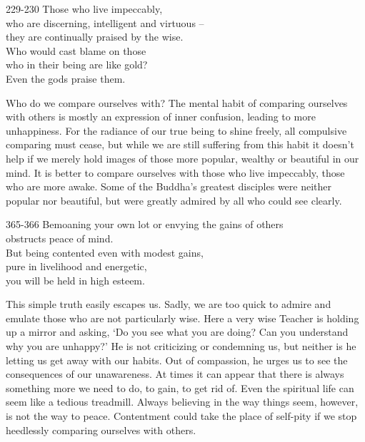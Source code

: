 
\begin{dhpVerse}{229-230}
\label{dhp-229}\label{dhp-230}
Those who live impeccably,\\
who are discerning, intelligent and virtuous --\\
they are continually praised by the wise.\\
Who would cast blame on those\\
who in their being are like gold?\\
Even the gods praise them.
\end{dhpVerse}

\begin{dhpRefl}
  Who do we compare ourselves with? The mental habit of comparing ourselves with
  others is mostly an expression of inner confusion, leading to more
  unhappiness. For the radiance of our true being to shine freely, all
  compulsive comparing must cease, but while we are still suffering from this
  habit it doesn’t help if we merely hold images of those more popular, wealthy
  or beautiful in our mind. It is better to compare ourselves with those who
  live impeccably, those who are more awake. Some of the Buddha’s greatest
  disciples were neither popular nor beautiful, but were greatly admired by all
  who could see clearly.
\end{dhpRefl}


\begin{dhpVerse}{365-366}
\label{dhp-365}\label{dhp-366}
Bemoaning your own lot or envying the gains of others\\
obstructs peace of mind.\\
But being contented even with modest gains,\\
pure in livelihood and energetic,\\
you will be held in high esteem. 
\end{dhpVerse}

\begin{dhpRefl}
  This simple truth easily escapes us. Sadly, we are too quick to admire and
  emulate those who are not particularly wise. Here a very wise Teacher is
  holding up a mirror and asking, ‘Do you see what you are doing? Can you
  understand why you are unhappy?’ He is not criticizing or condemning us, but
  neither is he letting us get away with our habits. Out of compassion, he urges
  us to see the consequences of our unawareness. At times it can appear that
  there is always something more we need to do, to gain, to get rid of. Even the
  spiritual life can seem like a tedious treadmill. Always believing in the way
  things seem, however, is not the way to peace. Contentment could take the
  place of self-pity if we stop heedlessly comparing ourselves with others.
\end{dhpRefl}

